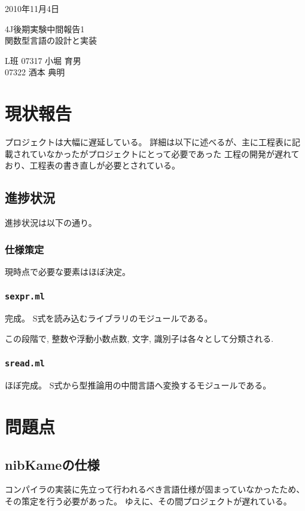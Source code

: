 \documentclass[a4paper, 10pt, oneside, notitlepage, onecolumn]{jsarticle}
\author{}
\begin{document}
\begin{flushright}
    2010年11月4日
\end{flushright}
\begin{center}
    4J後期実験中間報告1\\
\hspace{0.1em}
    \textsc{\LARGE 関数型言語の設計と実装}
\end{center}
\begin{flushright}
    L班 07317 小堀 育男\\
        07322 酒本 典明
\end{flushright}
\section{現状報告}
プロジェクトは大幅に遅延している。
詳細は以下に述べるが、主に工程表に記載されていなかったがプロジェクトにとって必要であった
工程の開発が遅れており、工程表の書き直しが必要とされている。

\subsection{進捗状況}
進捗状況は以下の通り。

\subsubsection{仕様策定}
現時点で必要な要素はほぼ決定。

\subsubsection{\texttt{sexpr.ml}}
完成。
S式を読み込むライブラリのモジュールである。

この段階で, 整数や浮動小数点数, 文字, 識別子は各々として分類される.

\subsubsection{\texttt{sread.ml}}
ほぼ完成。
S式から型推論用の中間言語へ変換するモジュールである。

\section{問題点}
\subsection{nibKameの仕様}
コンパイラの実装に先立って行われるべき言語仕様が固まっていなかったため、その策定を行う必要があった。
ゆえに、その間プロジェクトが遅れている。
\end{document}
